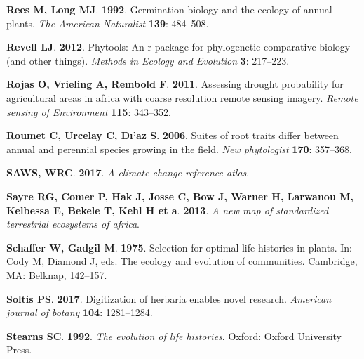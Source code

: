 \documentclass[man,floatsintext]{apa6}
\theoremstyle{definition}
\theoremstyle{definition}
\theoremstyle{definition}
\theoremstyle{remark}
\begin{document}
\leavevmode\hypertarget{ref-rees1992germination}{}%
\textbf{\textnormal{Rees M}, \textnormal{Long MJ}}. \textbf{1992}.
Germination biology and the ecology of annual plants. \emph{The American
Naturalist} \textbf{139}: 484--508.

\leavevmode\hypertarget{ref-revell2012phytools}{}%
\textbf{\textnormal{Revell LJ}}. \textbf{2012}. Phytools: An r package
for phylogenetic comparative biology (and other things). \emph{Methods
in Ecology and Evolution} \textbf{3}: 217--223.

\leavevmode\hypertarget{ref-rojas2011assessing}{}%
\textbf{\textnormal{Rojas O}, \textnormal{Vrieling A},
\textnormal{Rembold F}}. \textbf{2011}. Assessing drought probability
for agricultural areas in africa with coarse resolution remote sensing
imagery. \emph{Remote sensing of Environment} \textbf{115}: 343--352.

\leavevmode\hypertarget{ref-roumet2006suites}{}%
\textbf{\textnormal{Roumet C}, \textnormal{Urcelay C}, \textnormal{Dı'az
S}}. \textbf{2006}. Suites of root traits differ between annual and
perennial species growing in the field. \emph{New phytologist}
\textbf{170}: 357--368.

\leavevmode\hypertarget{ref-south2017a}{}%
\textbf{\textnormal{SAWS}, \textnormal{WRC}}. \textbf{2017}. \emph{A
climate change reference atlas}.

\leavevmode\hypertarget{ref-sayre2013new}{}%
\textbf{\textnormal{Sayre RG}, \textnormal{Comer P}, \textnormal{Hak J},
\textnormal{Josse C}, \textnormal{Bow J}, \textnormal{Warner H},
\textnormal{Larwanou M}, \textnormal{Kelbessa E}, \textnormal{Bekele T},
\textnormal{Kehl H et a}}. \textbf{2013}. \emph{A new map of
standardized terrestrial ecosystems of africa}.

\leavevmode\hypertarget{ref-schaffer1975selection}{}%
\textbf{\textnormal{Schaffer W}, \textnormal{Gadgil M}}. \textbf{1975}.
Selection for optimal life histories in plants. In: Cody M, Diamond J,
eds. The ecology and evolution of communities. Cambridge, MA: Belknap,
142--157.

\leavevmode\hypertarget{ref-soltis2017digitization}{}%
\textbf{\textnormal{Soltis PS}}. \textbf{2017}. Digitization of herbaria
enables novel research. \emph{American journal of botany} \textbf{104}:
1281--1284.

\leavevmode\hypertarget{ref-stearns1992evolution}{}%
\textbf{\textnormal{Stearns SC}}. \textbf{1992}. \emph{The evolution of
life histories}. Oxford: Oxford University Press.
\end{document}
